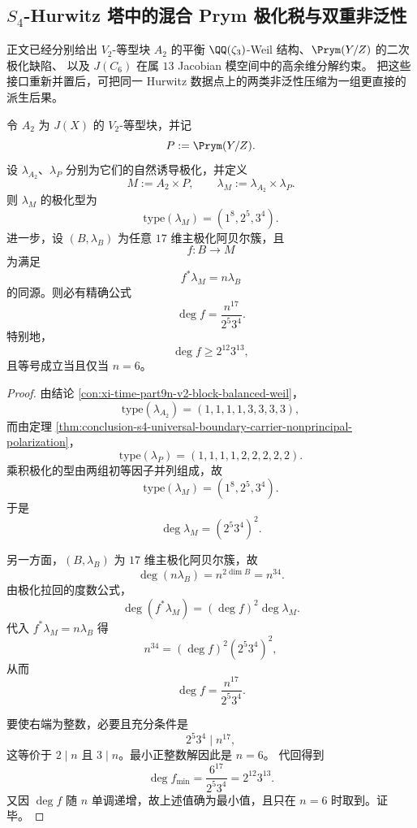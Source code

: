 \subsection{\texorpdfstring{$S_4$}{S4}-Hurwitz 塔中的混合 Prym 极化税与双重非泛性}

正文已经分别给出 \(V_2\)-等型块 \(A_2\) 的平衡
\(\QQ(\zeta_3)\)-Weil 结构、\(\Prym(Y/Z)\) 的二次极化缺陷、
以及 \(J(C_6)\) 在属 \(13\) Jacobian 模空间中的高余维分解约束。
把这些接口重新并置后，可把同一 Hurwitz 数据点上的两类非泛性压缩为一组更直接的派生后果。

\begin{theorem}\label{thm:derived-hurwitz-prym-mixed-principal-polarization-degree}
令 \(A_2\) 为 \(J(X)\) 的 \(V_2\)-等型块，并记
\[
P:=\Prym(Y/Z).
\]
设 \(\lambda_{A_2}\)、\(\lambda_P\) 分别为它们的自然诱导极化，并定义
\[
M:=A_2\times P,
\qquad
\lambda_M:=\lambda_{A_2}\times \lambda_P.
\]
则 \(\lambda_M\) 的极化型为
\[
\boxed{\;
\mathrm{type}(\lambda_M)=(1^8,2^5,3^4).\;}
\]
进一步，设 \((B,\lambda_B)\) 为任意 \(17\) 维主极化阿贝尔簇，且
\[
f:B\to M
\]
为满足
\[
f^\ast\lambda_M=n\lambda_B
\]
的同源。则必有精确公式
\[
\boxed{\;
\deg f=\frac{n^{17}}{2^5 3^4}.\;}
\]
特别地，
\[
\deg f\ge 2^{12}3^{13},
\]
且等号成立当且仅当 \(n=6\)。
\end{theorem}

\begin{proof}
由结论 \ref{con:xi-time-part9n-v2-block-balanced-weil}，
\[
\mathrm{type}(\lambda_{A_2})=(1,1,1,1,3,3,3,3),
\]
而由定理 \ref{thm:conclusion-s4-universal-boundary-carrier-nonprincipal-polarization}，
\[
\mathrm{type}(\lambda_P)=(1,1,1,1,2,2,2,2,2).
\]
乘积极化的型由两组初等因子并列组成，故
\[
\mathrm{type}(\lambda_M)=(1^8,2^5,3^4).
\]
于是
\[
\deg\lambda_M=(2^5 3^4)^2.
\]

另一方面，\((B,\lambda_B)\) 为 \(17\) 维主极化阿贝尔簇，故
\[
\deg(n\lambda_B)=n^{2\dim B}=n^{34}.
\]
由极化拉回的度数公式，
\[
\deg(f^\ast\lambda_M)=(\deg f)^2\deg\lambda_M.
\]
代入 \(f^\ast\lambda_M=n\lambda_B\) 得
\[
n^{34}=(\deg f)^2(2^5 3^4)^2,
\]
从而
\[
\deg f=\frac{n^{17}}{2^5 3^4}.
\]

要使右端为整数，必要且充分条件是
\[
2^5 3^4\mid n^{17},
\]
这等价于 \(2\mid n\) 且 \(3\mid n\)。最小正整数解因此是 \(n=6\)。
代回得到
\[
\deg f_{\min}=\frac{6^{17}}{2^5 3^4}=2^{12}3^{13}.
\]
又因 \(\deg f\) 随 \(n\) 单调递增，故上述值确为最小值，且只在 \(n=6\) 时取到。证毕。
\end{proof}

